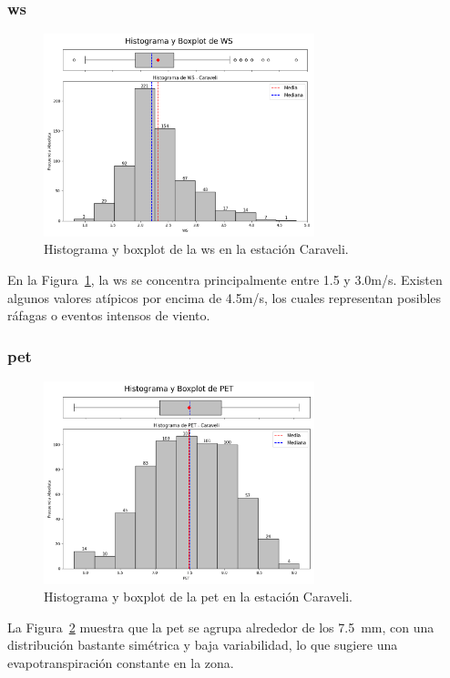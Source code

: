 \subsubsection*{\gls{ws} }
\begin{figure}[htbp]
\centering
\includegraphics[width=0.7\textwidth]{resultados/por_estacion_meteorologica/Caraveli/WS_histograma.png}
\caption{Histograma y boxplot de la \gls{ws}  en la estación Caraveli.}
\label{fig:caraveli_WS}
\end{figure}
En la Figura~\ref{fig:caraveli_WS}, la \gls{ws} se concentra principalmente entre 1.5 y 3.0m/s. Existen algunos valores atípicos por encima de 4.5m/s, los cuales representan posibles ráfagas o eventos intensos de viento.

\subsubsection*{\gls{pet} }
\begin{figure}[htbp]
\centering
\includegraphics[width=0.7\textwidth]{resultados/por_estacion_meteorologica/Caraveli/PET_histograma.png}
\caption{Histograma y boxplot de la \gls{pet}  en la estación Caraveli.}
\label{fig:caraveli_PET}
\end{figure}
La Figura~\ref{fig:caraveli_PET} muestra que la \gls{pet} se agrupa alrededor de los 7.5~mm, con una distribución bastante simétrica y baja variabilidad, lo que sugiere una evapotranspiración constante en la zona.

